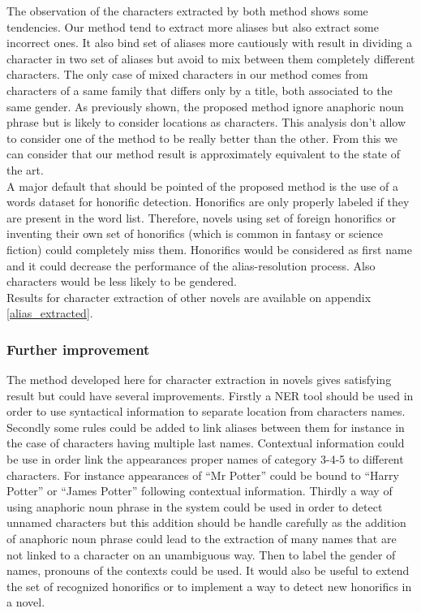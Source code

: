 \documentclass[a4paper, 12pt]{report}
\begin{document}
The observation of the characters extracted by both method shows some tendencies. Our method tend to extract more aliases but also extract some incorrect ones. 
It also bind set of aliases more cautiously with result in dividing a character in two set of aliases but avoid to mix between them completely different characters. 
The only case of mixed characters in our method comes from characters of a same family that differs only by a title, both associated to the same gender.
 As previously shown, the proposed method ignore anaphoric noun phrase but is likely to consider locations as characters. 
 This analysis don't allow to consider one of the method to be really better than the other. 
 From this we can consider that our method result is approximately equivalent to the state of the art. \\

A major default that should be pointed of the proposed method is the use of a words dataset for honorific detection. 
Honorifics are only properly labeled if they are present in the word list. Therefore, novels using set of foreign honorifics or inventing their own set of honorifics 
(which is common in fantasy or science fiction) could completely miss them. 
Honorifics would be considered as first name and it could decrease the performance of the alias-resolution process. 
Also characters would be less likely to be gendered. \\


Results for character extraction of other novels are available on appendix \ref{alias_extracted}. \\

\subsubsection{Further improvement}
The method developed here for character extraction in novels gives satisfying result but could have several improvements. 
Firstly a NER tool should be used in order to use syntactical information to separate location from characters names.
Secondly some rules could be added to link aliases between them for instance in the case of characters having multiple last names. 
Contextual information could be use in order link the appearances proper names of category 3-4-5 to different characters. 
For instance appearances of ``Mr Potter'' could be bound to ``Harry Potter'' or ``James Potter'' following contextual information. 
Thirdly a way of using anaphoric noun phrase in the system could be used in order to detect unnamed characters 
but this addition should be handle carefully as the addition of anaphoric noun phrase could lead to the extraction of many names that are not linked to a character
 on an unambiguous way. 
Then to label the gender of names, pronouns of the contexts could be used.
It would also be useful to extend the set of recognized honorifics or to implement a way to detect new honorifics in a novel.\\
\end{document}
